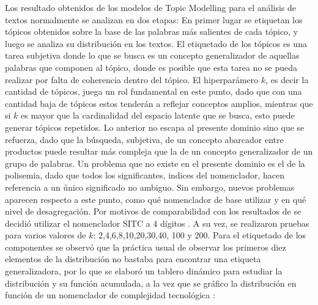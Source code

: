 \documentclass[class=article, crop=false]{standalone}
\begin{document}
Los resultado obtenidos de los modelos de Topic Modelling para el análisis de textos normalmente se analizan en dos etapas: En primer lugar se etiquetan los tópicos obtenidos sobre la base de las palabras más salientes de cada tópico, y luego se analiza su distribución en los textos. El etiquetado de los tópicos es una tarea subjetiva donde lo que se busca es un concepto generalizador de aquellas palabras que componen al tópico, donde es posible que esta tarea no se pueda realizar por falta de coherencia dentro del tópico. El hiperparámero $k$, es decir la cantidad de tópicos, juega un rol fundamental en este punto, dado que con una cantidad baja de tópicos estos tenderán a reflejar conceptos amplios, mientras que si $k$ es mayor que la cardinalidad del espacio latente que se busca, esto puede generar tópicos repetidos. 
Lo anterior no escapa al presente dominio sino que se refuerza, dado que la búsqueda, subjetiva, de un concepto abarcador entre productos puede resultar más compleja que la de un concepto generalizador de un grupo de palabras. Un problema que no existe en el presente dominio es el de la polisemia, dado que todos los significantes, indices del nomenclador, hacen referencia a un único significado no ambiguo. Sin embargo, nuevos problemas aparecen respecto a este punto, como qué nomenclador de base utilizar y en qué nivel de desagregación. Por motivos de comparabilidad con los resultados de \cite{molinari2016especializacion} se decidió utilizar el nomenclador SITC a 4 dígitos \citep{un2006standard}. A su vez, se realizaron pruebas para varios valores de $k$: 2,4,6,8,10,20,30,40, 100 y 200. Para el etiquetado de los componentes se observó que la práctica usual de observar los primeros diez elementos de la distribución no bastaba para encontrar una etiqueta generalizadora, por lo que se elaboró un tablero dinámico para estudiar la distribución y su función acumulada, a la vez que se gráfico la distribución en función de un nomenclador de complejidad tecnológica \citep{lall2000technological}: 
\end{document}
